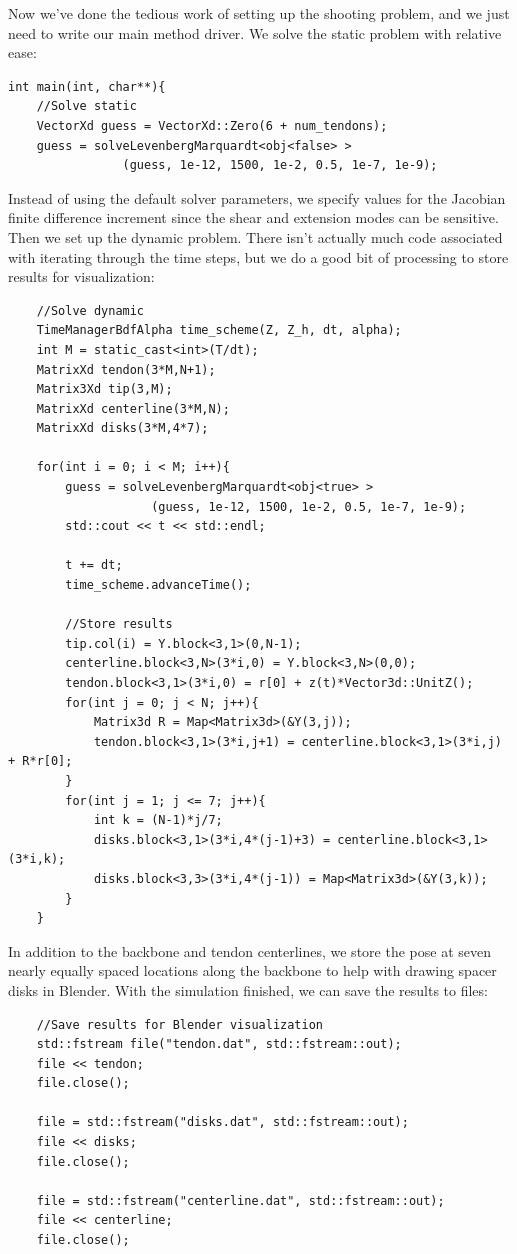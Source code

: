 \documentclass[12pt]{article}
\begin{document}
Now we've done the tedious work of setting up the shooting problem, and we just need to write our main method driver. We solve the static problem with relative ease:
\begin{lstlisting}
int main(int, char**){
    //Solve static
    VectorXd guess = VectorXd::Zero(6 + num_tendons);
    guess = solveLevenbergMarquardt<obj<false> >
                (guess, 1e-12, 1500, 1e-2, 0.5, 1e-7, 1e-9);
\end{lstlisting}
Instead of using the default solver parameters, we specify values for the Jacobian finite difference increment since the shear and extension modes can be sensitive.
Then we set up the dynamic problem. There isn't actually much code associated with iterating through the time steps, but we do a good bit of processing to store results for visualization:
\begin{lstlisting}
    //Solve dynamic
    TimeManagerBdfAlpha time_scheme(Z, Z_h, dt, alpha);
    int M = static_cast<int>(T/dt);
    MatrixXd tendon(3*M,N+1);
    Matrix3Xd tip(3,M);
    MatrixXd centerline(3*M,N);
    MatrixXd disks(3*M,4*7);

    for(int i = 0; i < M; i++){
        guess = solveLevenbergMarquardt<obj<true> >
                    (guess, 1e-12, 1500, 1e-2, 0.5, 1e-7, 1e-9);
        std::cout << t << std::endl;

        t += dt;
        time_scheme.advanceTime();

        //Store results
        tip.col(i) = Y.block<3,1>(0,N-1);
        centerline.block<3,N>(3*i,0) = Y.block<3,N>(0,0);
        tendon.block<3,1>(3*i,0) = r[0] + z(t)*Vector3d::UnitZ();
        for(int j = 0; j < N; j++){
            Matrix3d R = Map<Matrix3d>(&Y(3,j));
            tendon.block<3,1>(3*i,j+1) = centerline.block<3,1>(3*i,j) + R*r[0];
        }
        for(int j = 1; j <= 7; j++){
            int k = (N-1)*j/7;
            disks.block<3,1>(3*i,4*(j-1)+3) = centerline.block<3,1>(3*i,k);
            disks.block<3,3>(3*i,4*(j-1)) = Map<Matrix3d>(&Y(3,k));
        }
    }
\end{lstlisting}
In addition to the backbone and tendon centerlines, we store the pose at seven nearly equally spaced locations along the backbone to help with drawing spacer disks in Blender. With the simulation finished, we can save the results to files:
\begin{lstlisting}
    //Save results for Blender visualization
    std::fstream file("tendon.dat", std::fstream::out);
    file << tendon;
    file.close();

    file = std::fstream("disks.dat", std::fstream::out);
    file << disks;
    file.close();

    file = std::fstream("centerline.dat", std::fstream::out);
    file << centerline;
    file.close();
\end{lstlisting}
\end{document}
